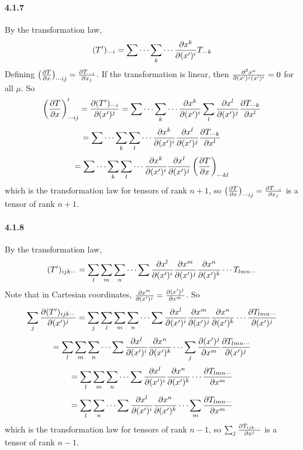 \documentclass[a4paper]{article}
\begin{document}
\paragraph{4.1.7}
By the transformation law, 
\[
(T')_{\cdots i}=\sum\cdots\sum_k\cdots\frac{\partial x^k}{\partial(x')^i}T_{\cdots k}
\]
Defining $\left(\frac{\partial T}{\partial x} \right)_{\cdots ij}=\frac{\partial T_{\cdots i}}{\partial x_j}$. If the transformation is linear, then $\frac{\partial^2x^\mu}{\partial(x')^j(x')^i}=0$ for all $\mu$. So
\[
\left(\frac{\partial T}{\partial x} \right)'_{\cdots ij}=\frac{\partial(T')_{\cdots i}}{\partial(x')^j}=\sum\cdots\sum_k\cdots\frac{\partial x^k}{\partial(x')^i}\sum_l\frac{\partial x^l}{\partial(x')^j}\frac{\partial T_{\cdots k}}{\partial x^l}
\]
\[
=\sum\cdots\sum_k\sum_l\cdots\frac{\partial x^k}{\partial(x')^i}\frac{\partial x^l}{\partial(x')^j}\frac{\partial T_{\cdots k}}{\partial x^l}
\]
\[
=\sum\cdots\sum_k\sum_l\cdots\frac{\partial x^k}{\partial(x')^i}\frac{\partial x^l}{\partial(x')^j}\left(\frac{\partial T}{\partial x}\right)_{\cdots kl}
\]
which is the transformation law for tensors of rank $n+1$, so $\left(\frac{\partial T}{\partial x} \right)_{\cdots ij}=\frac{\partial T_{\cdots i}}{\partial x_j}$ is a tensor of rank $n+1$.

\paragraph{4.1.8}
By the transformation law, 
\[
(T')_{ijk\cdots}=\sum_l\sum_m\sum_n\cdots\sum\frac{\partial x^l}{\partial(x')^i}\frac{\partial x^m}{\partial(x')^j}\frac{\partial x^n}{\partial(x')^k}\cdots T_{lmn\cdots}
\]
Note that in Cartesian coordinates, $\frac{\partial x^m}{\partial(x')^j}=\frac{\partial(x')^j}{\partial x^m}$. So
\[
\sum_j\frac{\partial(T')_{ijk\cdots}}{\partial(x')^j}=\sum_j\sum_l\sum_m\sum_n\cdots\sum\frac{\partial x^l}{\partial(x')^i}\frac{\partial x^m}{\partial(x')^j}\frac{\partial x^n}{\partial(x')^k}\cdots\frac{\partial T_{lmn\cdots}}{\partial(x')^j}
\]
\[=
\sum_l\sum_m\sum_n\cdots\sum\frac{\partial x^l}{\partial(x')^i}\frac{\partial x^n}{\partial(x')^k}\cdots\sum_j\frac{\partial(x')^j}{\partial x^m}\frac{\partial T_{lmn\cdots}}{\partial(x')^j}
\]
\[
=\sum_l\sum_m\sum_n\cdots\sum\frac{\partial x^l}{\partial(x')^i}\frac{\partial x^n}{\partial(x')^k}\cdots\frac{\partial T_{lmn\cdots}}{\partial x^m}
\]
\[
=\sum_l\sum_n\cdots\sum\frac{\partial x^l}{\partial(x')^i}\frac{\partial x^n}{\partial(x')^k}\cdots\sum_m\frac{\partial T_{lmn\cdots}}{\partial x^m}
\]
which is the transformation law for tensors of rank $n-1$, so $\sum_j\frac{\partial T_{ijk\cdots}}{\partial x^j}$ is a tensor of rank $n-1$.
\end{document}
